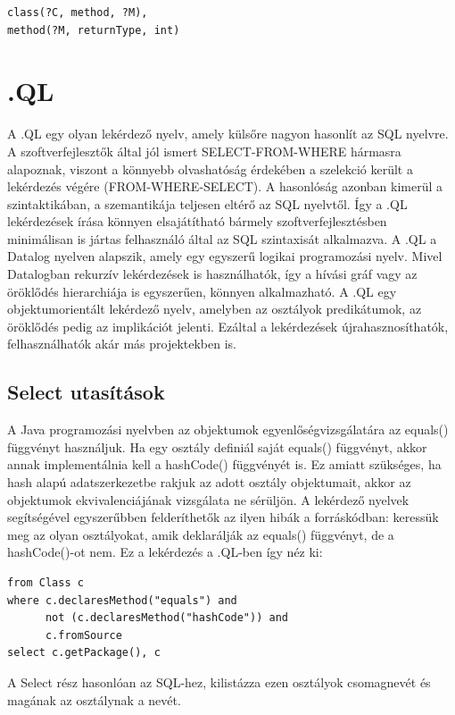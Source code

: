 \documentclass[a4paper,12pt]{report}
\begin{document}
\begin{verbatim}
class(?C, method, ?M),
method(?M, returnType, int)
\end{verbatim}

\section{.QL}
A .QL egy olyan lekérdező nyelv, amely külsőre nagyon hasonlít az SQL nyelvre. A szoftverfejlesztők által jól ismert SELECT-FROM-WHERE hármasra alapoznak, viszont a könnyebb olvashatóság érdekében a szelekció került a lekérdezés végére (FROM-WHERE-SELECT). A hasonlóság azonban kimerül a szintaktikában, a szemantikája teljesen eltérő az SQL nyelvtől. Így a .QL lekérdezések írása könnyen elsajátítható bármely szoftverfejlesztésben minimálisan is jártas felhasználó által az SQL szintaxisát alkalmazva. A .QL a Datalog nyelven alapszik, amely egy egyszerű logikai programozási nyelv. Mivel Datalogban rekurzív lekérdezések is használhatók, így a hívási gráf vagy az öröklődés hierarchiája is egyszerűen, könnyen alkalmazható. A .QL egy objektumorientált lekérdező nyelv, amelyben az osztályok predikátumok, az öröklődés pedig az implikációt jelenti. Ezáltal a lekérdezések újrahasznosíthatók, felhasználhatók akár más projektekben is.
\subsection{Select utasítások}
\par A Java programozási nyelvben az objektumok egyenlőségvizsgálatára az equals() függvényt használjuk. Ha egy osztály definiál saját equals() függvényt, akkor annak implementálnia kell a hashCode() függvényét is. Ez amiatt szükséges, ha hash alapú adatszerkezetbe rakjuk az adott osztály objektumait, akkor az objektumok ekvivalenciájának vizsgálata ne sérüljön. A lekérdező nyelvek segítségével egyszerűbben felderíthetők az ilyen hibák a forráskódban: keressük meg az olyan osztályokat, amik deklarálják az equals() függvényt, de a hashCode()-ot nem. Ez a lekérdezés a .QL-ben így néz ki:
\begin{verbatim}
from Class c
where c.declaresMethod("equals") and
      not (c.declaresMethod("hashCode")) and
      c.fromSource
select c.getPackage(), c
\end{verbatim}
A Select rész hasonlóan az SQL-hez, kilistázza ezen osztályok csomagnevét és magának az osztálynak a nevét.
\end{document}

